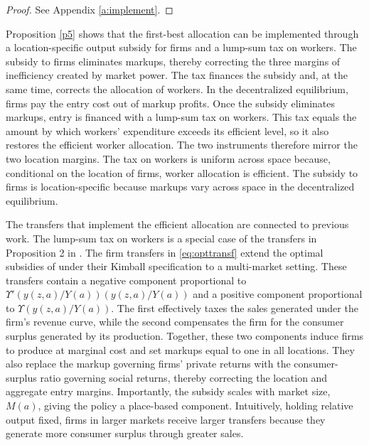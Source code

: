 \begin{proof}
See Appendix \ref{a:implement}.
\end{proof}

Proposition \ref{p5} shows that the first-best allocation can be implemented through a location-specific output subsidy for firms and a lump-sum tax on workers. The subsidy to firms eliminates markups, thereby correcting the three margins of inefficiency created by market power. The tax finances the subsidy and, at the same time, corrects the allocation of workers. In the decentralized equilibrium, firms pay the entry cost out of markup profits. Once the subsidy eliminates markups, entry is financed with a lump-sum tax on workers. This tax equals the amount by which workers’ expenditure exceeds its efficient level, so it also restores the efficient worker allocation. The two instruments therefore mirror the two location margins. The tax on workers is uniform across space because, conditional on the location of firms, worker allocation is efficient. The subsidy to firms is location-specific because markups vary across space in the decentralized equilibrium.

The transfers that implement the efficient allocation are connected to previous work. The lump-sum tax on workers is a special case of the transfers in Proposition 2 in \textcite{Fajgelbaum&Gaubert20}. The firm transfers in \eqref{eq:opttransf} extend the optimal subsidies of \textcite{EdmondMidrigan&Xu23} under their Kimball specification to a multi-market setting. These transfers contain a negative component proportional to $\Upsilon'\left(y(z,a)/Y(a)\right)\left(y(z,a)/Y(a)\right)$ and a positive component proportional to $\Upsilon\left(y(z,a)/Y(a)\right)$. The first effectively taxes the sales generated under the firm’s revenue curve, while the second compensates the firm for the consumer surplus generated by its production. Together, these two components induce firms to produce at marginal cost and set markups equal to one in all locations. They also replace the markup governing firms’ private returns with the consumer-surplus ratio governing social returns, thereby correcting the location and aggregate entry margins. Importantly, the subsidy scales with market size, $M(a)$, giving the policy a place-based component. Intuitively, holding relative output fixed, firms in larger markets receive larger transfers because they generate more consumer surplus through greater sales.

